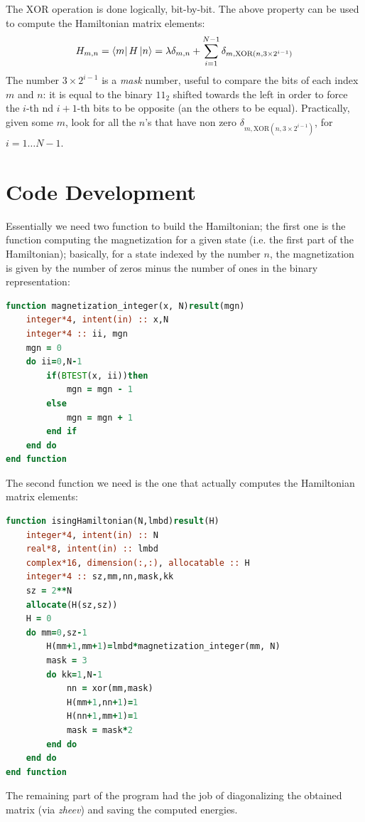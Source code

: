 \documentclass{article}
\begin{document}
The $\text{XOR}$ operation is done logically, bit-by-bit. The above property can be used to compute the Hamiltonian matrix elements:
\begin{equation}
	H_{m,n} = \bra{m} H \ket{n} = \lambda \delta_{m,n} + \sum_{i=1}^{N-1} \delta_{m,\text{XOR}(n, 3\times 2^{i-1})}
\end{equation}
The number $3 \times 2^{i-1}$ is a \textit{mask} number, useful to compare the bits of each index $m$ and $n$: it is equal to the binary $11_2$ shifted towards the left in order to force the $i$-th nd $i+1$-th bits to be opposite (an the others to be equal). Practically, given some $m$, look for all the $n$'s that have non zero $\delta_{m,\text{XOR}(n, 3\times 2^{i-1})}$, for $i=1 \dots N-1$.
\section*{Code Development}
Essentially we need two function to build the Hamiltonian; the first one is the function computing the magnetization for a given state (i.e. the first part of the Hamiltonian); basically, for a state indexed by the number $n$, the magnetization is given by the number of zeros minus the number of ones in the binary representation:
\begin{lstlisting}[language=Fortran]
function magnetization_integer(x, N)result(mgn)
	integer*4, intent(in) :: x,N
	integer*4 :: ii, mgn
	mgn = 0
	do ii=0,N-1
		if(BTEST(x, ii))then
			mgn = mgn - 1
		else
			mgn = mgn + 1
		end if
	end do
end function
\end{lstlisting}
The second function we need is the one that actually computes the Hamiltonian matrix elements:
\begin{small}
\begin{lstlisting}[language=Fortran]
function isingHamiltonian(N,lmbd)result(H)
	integer*4, intent(in) :: N
	real*8, intent(in) :: lmbd
	complex*16, dimension(:,:), allocatable :: H
	integer*4 :: sz,mm,nn,mask,kk
	sz = 2**N
	allocate(H(sz,sz))
	H = 0
	do mm=0,sz-1
		H(mm+1,mm+1)=lmbd*magnetization_integer(mm, N)
		mask = 3
		do kk=1,N-1
			nn = xor(mm,mask)
			H(mm+1,nn+1)=1
			H(nn+1,mm+1)=1
			mask = mask*2
		end do
	end do
end function
\end{lstlisting}
\end{small}
The remaining part of the program had the job of diagonalizing the obtained matrix (via \textit{zheev}) and saving the computed energies.
\end{document}
